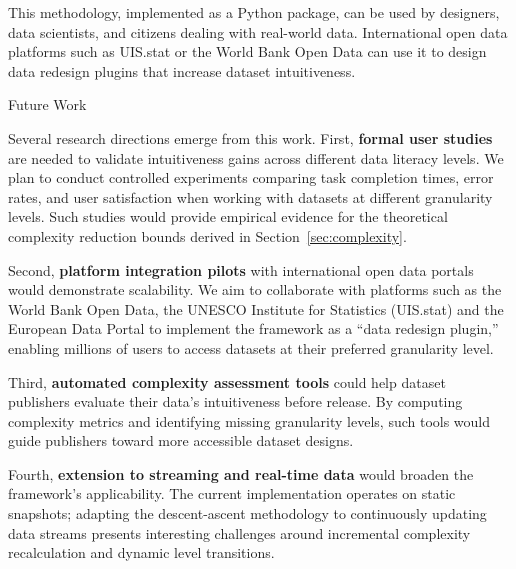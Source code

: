 \documentclass[]{hdsr}
\makeatletter
\def\subsection{\@startsection{subsection}{2}%
  \z@{.5\linespacing\@plus.7\linespacing}{.5\linespacing}%
  {\normalfont\bfseries}}
\theoremstyle{plain}      %
\theoremstyle{definition} %
\theoremstyle{remark}     %
\makeatother
\begin{document}
\vspace{1em}

\noindent This methodology, implemented as a Python package, can be used by designers, data scientists, and citizens dealing with real-world data. International open data platforms such as UIS.stat or the World Bank Open Data can use it to design data redesign plugins that increase dataset intuitiveness.

\subsection{Future Work}

\noindent  Several research directions emerge from this work. First, \textbf{formal user studies} are needed to validate intuitiveness gains across different data literacy levels. We plan to conduct controlled experiments comparing task completion times, error rates, and user satisfaction when working with datasets at different granularity levels. Such studies would provide empirical evidence for the theoretical complexity reduction bounds derived in Section~\ref{sec:complexity}.

\vspace{1em}

\noindent Second, \textbf{platform integration pilots} with international open data portals would demonstrate scalability. We aim to collaborate with platforms such as the World Bank Open Data, the UNESCO Institute for Statistics (UIS.stat) and the European Data Portal to implement the framework as a ``data redesign plugin,'' enabling millions of users to access datasets at their preferred granularity level.

\vspace{1em}

\noindent Third, \textbf{automated complexity assessment tools} could help dataset publishers evaluate their data's intuitiveness before release. By computing complexity metrics and identifying missing granularity levels, such tools would guide publishers toward more accessible dataset designs.

\vspace{1em}

\noindent Fourth, \textbf{extension to streaming and real-time data} would broaden the framework's applicability. The current implementation operates on static snapshots; adapting the descent-ascent methodology to continuously updating data streams presents interesting challenges around incremental complexity recalculation and dynamic level transitions.
\end{document}
